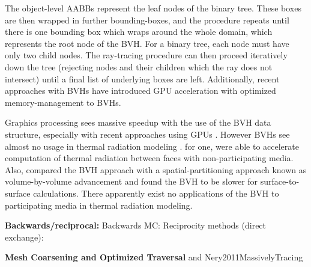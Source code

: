 The object-level AABBs represent the leaf nodes of the binary tree. These boxes are then wrapped in further bounding-boxes, and the procedure repeats until there is one bounding box which wraps around the whole domain, which represents the root node of the BVH. 
For a binary tree, each node must have only two child nodes. The ray-tracing procedure can then proceed iteratively down the tree (rejecting nodes and their children which the ray does not intersect) until a final list of underlying boxes are left.
Additionally, recent approaches with BVHs have introduced GPU acceleration with optimized memory-management to BVHs.

Graphics processing sees massive speedup with the use of the BVH data structure, especially with recent approaches using GPUs \cite{Nery2013ParallelGPGPUs,Meister2021ATracing,Karras2012MaximizingTrees}.
However BVHs see almost no usage in thermal radiation modeling \cite{Liu2020TheFlames}.
\citet{Kuczynskia2014RadiationBoundaries} for one, were able to accelerate computation of thermal radiation between faces with non-participating media. 
Also, \citet{Mazumder2006MethodsTransport} compared the BVH approach with a spatial-partitioning approach known as volume-by-volume advancement and found the BVH to be slower for surface-to-surface calculations. 
There apparently exist no applications of the BVH to participating media in thermal radiation modeling.

\textbf{Backwards/reciprocal:}
Backwards MC: \cite{Modest2003BackwardTransfer,Walters1992RigorousMedia}
Reciprocity methods (direct exchange): \cite{Tesse2002RadiativeApproach}



\textbf{Mesh Coarsening and Optimized Traversal}
and \citet{Kelm2021TheTransport}
Nery2011MassivelyTracing